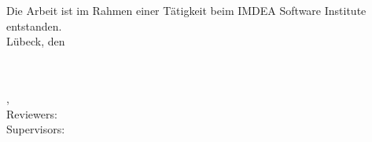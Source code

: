 \begin{titlepage}
      Die Arbeit ist im Rahmen einer T\"atigkeit beim IMDEA Software Institute entstanden.\\[10mm]

    Lübeck, den \thesisDate \\

\end{titlepage}


\hfill
\vfill

{
    \small
    \textbf{\thesisName} \\
    \textit{\thesisTitle} \\
    \thesisSubject, \thesisDate \\
    Reviewers: \thesisFirstReviewer \\
    Supervisors: \thesisFirstSupervisor \\[1.5em]%
    \textbf{\thesisUniversity} \\
    \thesisUniversityInstitute \\
    \thesisUniversityStreetAddress \\
    \thesisUniversityPostalCode\ \thesisUniversityCity
}
